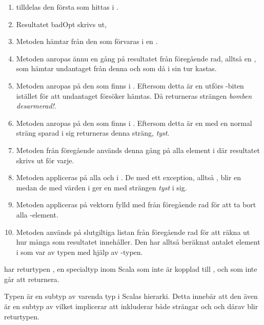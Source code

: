 \begin{enumerate}
\item {} tilldelas den första  som hittas i .
\item Resultatet badOpt skrivs ut, \\
\item Metoden  hämtar från  den  som förvaras i en .
\item Metoden  anropas ännu en gång på resultatet från föregående rad, alltså en , som hämtar undantaget från denna och som då i sin tur kastas.
\item Metoden  anropas på den  som finns i . Eftersom detta är en  utförs -biten istället för att undantaget försöker hämtas. Då returneras strängen \textit{bomben desarmerad!}.
\item Metoden  anropas på den  som finns i . Eftersom detta är en  med en normal sträng sparad i sig returneras denna sträng, \textit{tyst}.
\item Metoden från föregående används denna gång på alla element i  där resultatet skrivs ut för varje.
\item Metoden  appliceras på alla  och  i . De med ett exception, alltså , blir en  medan de med värden i  ger en  med strängen \textit{tyst} i sig.
\item Metoden  appliceras på vektorn fylld med  från föregående rad för att ta bort alla -element.
\item Metoden  används på slutgiltiga listan från föregående rad för att räkna ut hur många  som resultatet innehåller. Den har alltså beräknat antalet element i  som var av typen  med hjälp av -typen.
\end{enumerate}

\SubtaskSolved  {} har returtypen , en specialtyp inom Scala som inte är kopplad till , och som inte går att returnera.

\SubtaskSolved  Typen  är en subtyp av varenda typ i Scalas hierarki. Detta innebär att den även är en subtyp av  vilket implicerar att  inkluderar både strängar och  och därav blir returtypen.


